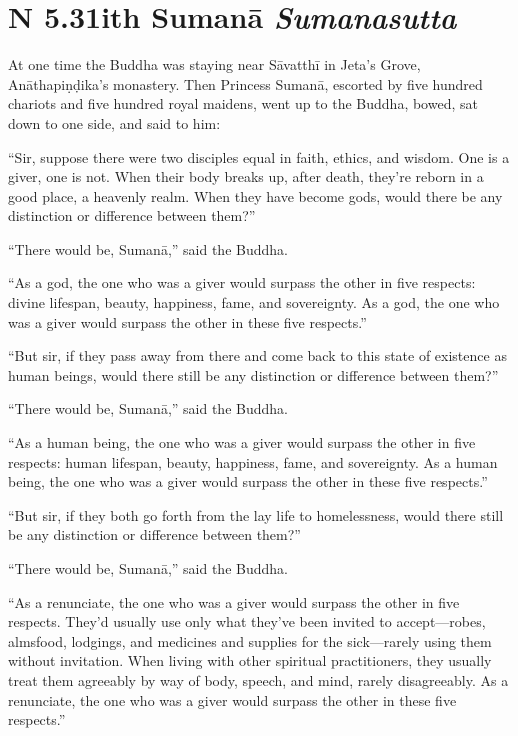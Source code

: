 \documentclass[12pt,openany]{book}%
\newcommand*{\suttatitleacronym}[1]{\smaller[2]{#1}\vspace*{.3em}}
\newcommand*{\suttatitletranslation}[1]{\linebreak{#1}}
\newcommand*{\suttatitleroot}[1]{\linebreak\smaller[2]\itshape{#1}}
\newcommand*{\tocacronym}[1]{\hspace*{-3.3em}{#1}\quad}
\newcommand*{\toctranslation}[1]{#1}
\newcommand*{\tocroot}[1]{(\textit{#1})}
\begin{document}
%
\section*{{\suttatitleacronym AN 5.31}{\suttatitletranslation With Sumanā }{\suttatitleroot Sumanasutta}}
\addcontentsline{toc}{section}{\tocacronym{AN 5.31} \toctranslation{With Sumanā } \tocroot{Sumanasutta}}

At one time the Buddha was staying near \textsanskrit{Sāvatthī} in Jeta’s Grove, \textsanskrit{Anāthapiṇḍika}’s monastery. Then Princess \textsanskrit{Sumanā}, escorted by five hundred chariots and five hundred royal maidens, went up to the Buddha, bowed, sat down to one side, and said to him: 

“Sir, suppose there were two disciples equal in faith, ethics, and wisdom. One is a giver, one is not. When their body breaks up, after death, they’re reborn in a good place, a heavenly realm. When they have become gods, would there be any distinction or difference between them?” 

“There would be, \textsanskrit{Sumanā},” said the Buddha. 

“As a god, the one who was a giver would surpass the other in five respects: divine lifespan, beauty, happiness, fame, and sovereignty. As a god, the one who was a giver would surpass the other in these five respects.” 

“But sir, if they pass away from there and come back to this state of existence as human beings, would there still be any distinction or difference between them?” 

“There would be, \textsanskrit{Sumanā},” said the Buddha. 

“As a human being, the one who was a giver would surpass the other in five respects: human lifespan, beauty, happiness, fame, and sovereignty. As a human being, the one who was a giver would surpass the other in these five respects.” 

“But sir, if they both go forth from the lay life to homelessness, would there still be any distinction or difference between them?” 

“There would be, \textsanskrit{Sumanā},” said the Buddha. 

“As a renunciate, the one who was a giver would surpass the other in five respects. They’d usually use only what they’ve been invited to accept—robes, almsfood, lodgings, and medicines and supplies for the sick—rarely using them without invitation. When living with other spiritual practitioners, they usually treat them agreeably by way of body, speech, and mind, rarely disagreeably. As a renunciate, the one who was a giver would surpass the other in these five respects.” 
\end{document}
